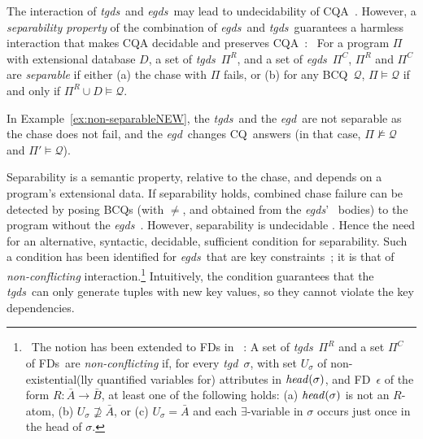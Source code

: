 \documentclass[format=acmsmall, review=false, screen=true]{acmart}
\newcommand{\ignore}[1]{}
\newcommand{\bcq}{BCQ}
\newcommand{\cq}{CQ}
\newcommand{\boxtheorem}{\ensuremath{\hfill \Box}}
\newcommand{\mc}[1]{\mathcal{ #1}}
\newcommand{\nit}[1]{{\it #1}}
\newcommand{\rules}{\Pi^{R}}
\newcommand{\constraints}{\Pi^{C}}
\newcommand{\prg}{\Pi}
\newcommand{\fd}{FD}
\newcommand{\fds}{FDs}
\newcommand{\ideps}{IDs}
\newcommand{\vectt}[1]{\bar{#1}}
\newcommand{\egds}{{\em egds}}
\newcommand{\egd}{{\em egd}}
\newcommand{\tgds}{{\em tgds}}
\newcommand{\tgd}{{\em tgd}}
\begin{document}
The interaction of \tgds \ and \egds \  may lead to undecidability of CQA~\cite{cali03,chandra,johnson,mitchell}. \ignore{In fact, this is true even in simple cases, such as combinations of {\em functional dependencies} (\fds) and {\em inclusion dependencies} (\ideps)~\cite{chandra}, or {\em key constraints} and \ideps~\cite{cali03}.} However, a {\em separability property} of the combination of \egds \ and \tgds \ guarantees a harmless interaction that makes  CQA  decidable and preserves CQA~\cite{cali12}: \ For a program $\prg$ with extensional database $D$, a set of \tgds \ $\rules$, and a set of \egds \ $\constraints$,  $\rules$ and $\constraints$ are {\it separable} if either (a) the chase with $\prg$ fails, or (b) for any \bcq \ $\mc{Q}$, $\prg \models \mc{Q}$ if and only if $\rules \cup D \models \mc{Q}$.%

In Example~\ref{ex:non-separableNEW}, the \tgds \ and the \egd \ are not separable as the chase does not fail, and the \egd \ changes \cq \ answers (in that case, $\prg \not\models \mc{Q}$ and $\prg' \models \mc{Q}$).

Separability is a semantic property, relative to the chase, and depends on a program's extensional data. If separability holds, combined chase failure can be detected by posing
\bcq s (with $\neq$, and obtained from the \egds' \ bodies)  to the program without the \egds~\cite[theo. 1]{cali12amw}. However, separability is undecidable \cite{cali12amw}. Hence the need for an alternative, syntactic,  decidable, sufficient condition for separability. Such a condition has been identified for \egds \ that are key constraints~\cite{cali13}; it is that of {\em non-conflicting} interaction.\footnote{\ The notion has been extended to FDs in ~\cite{cali12}: A set of \tgds \ $\rules$ and a set $\constraints$ of \fds \ are {\it non-conflicting} if, for every  \tgd \ $\sigma$, with set $U_\sigma$ of
 non-existential(lly quantified variables for) attributes in $\nit{head}(\sigma)$, and \fd \ $\epsilon$ of the form $R:\vectt{A} \rightarrow \vectt{B}$, at least one of the following holds: (a) $\nit{head}(\sigma)$ is not an $R$-atom, (b) $U_\sigma \not\supseteq \vectt{A}$, or (c) $U_\sigma = \vectt{A}$ and each $\exists$-variable in $\sigma$ occurs just once in the head of $\sigma$. }  Intuitively,  the condition guarantees that the \tgds \ can only generate tuples with new key values, so they cannot violate the key dependencies.
\end{document}
